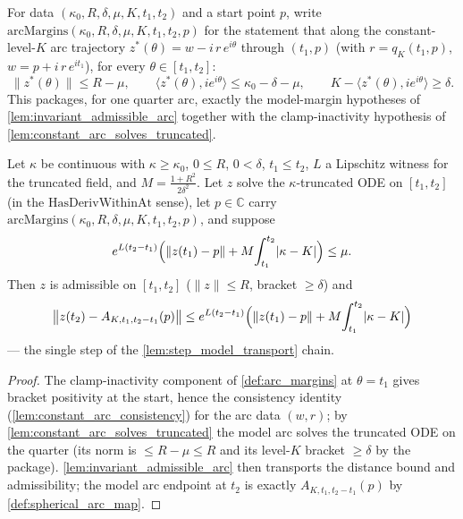 \begin{definition}
  \label{def:arc_margins}
  For data $(\kappa_0,R,\delta,\mu,K,t_1,t_2)$ and a start point $p$, write
  $\mathrm{arcMargins}(\kappa_0,R,\delta,\mu,K,t_1,t_2,p)$ for the statement that
  along the constant-level-$K$ arc trajectory
  $z^\ast(\theta)=w-i\,r\,e^{i\theta}$ through $(t_1,p)$ (with $r=q_K(t_1,p)$,
  $w=p+i\,r\,e^{it_1}$), for every $\theta\in[t_1,t_2]$:
  \[
    \|z^\ast(\theta)\|\le R-\mu,\qquad
    \langle z^\ast(\theta),ie^{i\theta}\rangle\le\kappa_0-\delta-\mu,\qquad
    K-\langle z^\ast(\theta),ie^{i\theta}\rangle\ge\delta .
  \]
  This packages, for one quarter arc, exactly the model-margin hypotheses of
  \cref{lem:invariant_admissible_arc} together with the clamp-inactivity hypothesis
  of \cref{lem:constant_arc_solves_truncated}.
\end{definition}

\begin{lemma}
  \label{lem:quarter_step_transport}
  Let $\kappa$ be continuous with $\kappa\ge\kappa_0$, $0\le R$, $0<\delta$,
  $t_1\le t_2$, $L$ a Lipschitz witness for the truncated field, and
  $M=\tfrac{1+R^2}{2\delta^2}$. Let $z$ solve the $\kappa$-truncated ODE on
  $[t_1,t_2]$ (in the $\mathrm{HasDerivWithinAt}$ sense), let $p\in\mathbb C$ carry
  $\mathrm{arcMargins}(\kappa_0,R,\delta,\mu,K,t_1,t_2,p)$, and suppose
  \[
    e^{L(t_2-t_1)}\Bigl(\|z(t_1)-p\|+M\!\int_{t_1}^{t_2}\!|\kappa-K|\Bigr)\le\mu .
  \]
  Then $z$ is admissible on $[t_1,t_2]$ ($\|z\|\le R$, bracket $\ge\delta$) and
  \[
    \bigl\|z(t_2)-A_{K,t_1,t_2-t_1}(p)\bigr\|
    \le e^{L(t_2-t_1)}\Bigl(\|z(t_1)-p\|+M\!\int_{t_1}^{t_2}\!|\kappa-K|\Bigr)
  \]
  — the single step of the \cref{lem:step_model_transport} chain.
\end{lemma}

\begin{proof}
        \leanok
  The clamp-inactivity component of \cref{def:arc_margins} at $\theta=t_1$ gives
  bracket positivity at the start, hence the consistency identity
  (\cref{lem:constant_arc_consistency}) for the arc data $(w,r)$; by
  \cref{lem:constant_arc_solves_truncated} the model arc solves the truncated ODE on
  the quarter (its norm is $\le R-\mu\le R$ and its level-$K$ bracket $\ge\delta$ by
  the package). \cref{lem:invariant_admissible_arc} then transports the distance
  bound and admissibility; the model arc endpoint at $t_2$ is exactly
  $A_{K,t_1,t_2-t_1}(p)$ by \cref{def:spherical_arc_map}.
\end{proof}

